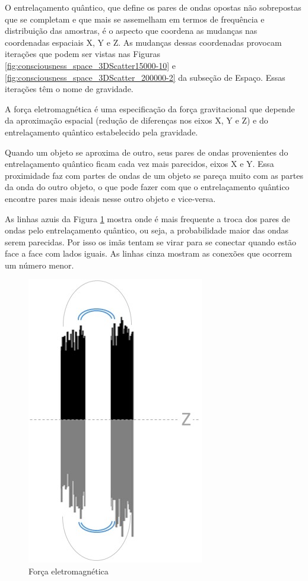 O entrelaçamento quântico, que define os pares de ondas opostas não sobrepostas que se completam e que mais se assemelham em termos de frequência e distribuição das amostras, é o aspecto que coordena as mudanças nas coordenadas espaciais X, Y e Z. As mudanças dessas coordenadas provocam iterações que podem ser vistas nas Figuras \ref{fig:consciousness_space_3DScatter15000-10} e \ref{fig:consciousness_space_3DScatter_200000-2} da subseção de Espaço. Essas iterações têm o nome de gravidade.

A força eletromagnética é uma especificação da força gravitacional que depende da aproximação espacial (redução de diferenças nos eixos X, Y e Z) e do entrelaçamento quântico estabelecido pela gravidade.

Quando um objeto se aproxima de outro, seus pares de ondas provenientes do entrelaçamento quântico ficam cada vez mais parecidos, eixos X e Y. Essa proximidade faz com partes de ondas de um objeto se pareça muito com as partes da onda do outro objeto, o que pode fazer com que o entrelaçamento quântico encontre pares mais ideais nesse outro objeto e vice-versa.  

As linhas azuis da Figura \ref{fig:consciousness_electromaagnetic_force} mostra onde é mais frequente a troca dos pares de ondas pelo entrelaçamento quântico, ou seja, a probabilidade maior das ondas serem parecidas. Por isso os imãs tentam se virar para se conectar quando estão face a face com lados iguais. As linhas cinza mostram as conexões que ocorrem um número menor. 
\begin{figure}[H]
\caption{Força eletromagnética}
\label{fig:consciousness_electromaagnetic_force}
\centering
\includegraphics[scale=.8]{sections/images/consciousness_electromaagnetic_force.jpg}
\end{figure}

